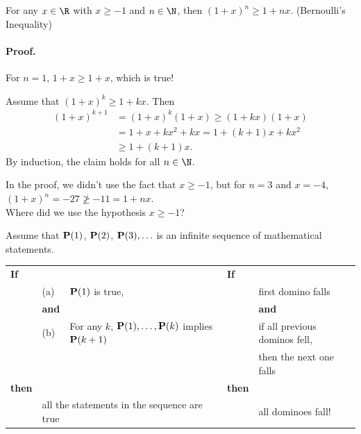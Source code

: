 \begin{example}
	
For any $x\in \R$ with $x\geq -1$ and $n \in \N$, then $(1+x)^n \geq 1+nx$. \hfill (Bernoulli's Inequality)

\paragraph{Proof.}
For $n=1$, $1+x\geq 1+x$, which is true!

Assume that $(1+x)^k \geq 1+kx$. Then
\begin{align*}
(1+x)^{k+1} 
	& = (1+x)^k (1+x) 
		\geq (1+kx)(1+x) \\
	& = 1 + x + kx^2 + kx 
		= 1+(k+1)x+kx^2 \\
	& \geq 1+(k+1)x.
\end{align*}
By induction, the claim holds for all $n \in \N$.

\begin{graybox}
	
In the proof, we didn't use the fact that $x\geq -1$, but 
for $n=3$ and $x=-4$, $(1+x)^n = -27 \not\geq -11 = 1+nx$.  \\

Where did we use the hypothesis $x\geq -1$?
\end{graybox}

\end{example}







\newpage

\begin{definition}

Assume that ${\bf P}(1)$, ${\bf P}(2)$, ${\bf P}(3), \ldots$ is an infinite sequence of mathematical statements. \\

\begin{tabular}{lll|ll}
{\bf If} & & & {\bf If} \\
	& (a) & ${\bf P}(1)$ is true, 		 & & first domino falls \\
	&  {\bf and} & & & {\bf and} \\
	& (b) &  For any $k$, ${\bf P}(1), \ldots, {\bf P}(k)$ implies ${\bf P}(k+1)$ 	& & if all previous dominos fell, \\
	& & & & then the next one falls \\
{\bf then} & & & {\bf then} \\
	& \multicolumn{2}{l|}{all the statements in the sequence are true} & & all dominoes fall!
\end{tabular}

\end{definition}


